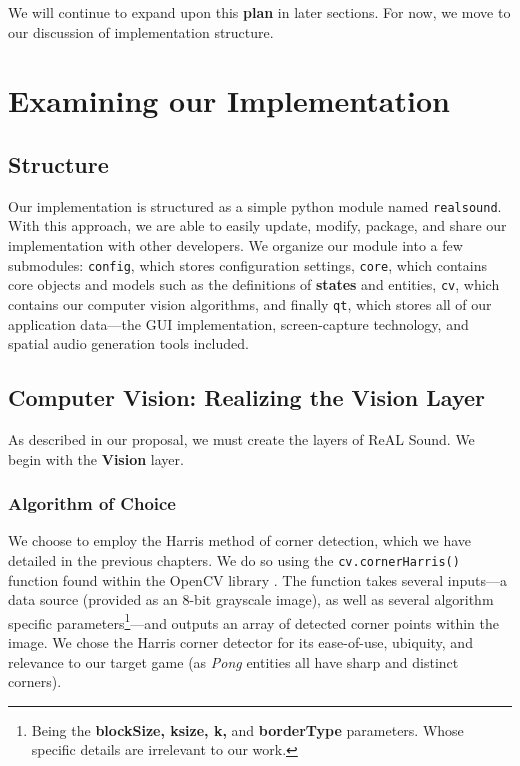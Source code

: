 \documentclass{report}
\newcommand{\rs}{ReAL Sound\xspace}
\newcommand{\state}[1]{\textbf{#1}}
\newcommand{\vision}{\textbf{Vision}\xspace}
\newcommand{\tech}[1]{\textbf{#1}}
\begin{document}
We will continue to expand upon this \state{plan} in later sections. For now, we move to our discussion of implementation structure.

\section{Examining our Implementation}

\subsection{Structure}

Our implementation is structured as a simple python module named \texttt{realsound}. With this approach, we are able to easily update, modify, package, and share our implementation with other developers. We organize our module into a few submodules: \texttt{config}, which stores configuration settings, \texttt{core}, which contains core objects and models such as the definitions of \state{states} and entities, \texttt{cv}, which contains our computer vision algorithms, and finally \texttt{qt}, which stores all of our application data---the GUI implementation, screen-capture technology, and spatial audio generation tools included. 

\subsection{Computer Vision: Realizing the Vision Layer}

As described in our proposal, we must create the layers of \rs. We begin with the \vision layer. 

\subsubsection{Algorithm of Choice}

We choose to employ the Harris method of corner detection, which we have detailed in the previous chapters. We do so using the \texttt{cv.cornerHarris()} function found within the OpenCV library \cite{OpenCV}. The function takes several inputs---a data source (provided as an 8-bit grayscale image), as well as several algorithm specific parameters\footnote{Being the \tech{blockSize, ksize, k, } and \tech{borderType} parameters. Whose specific details are irrelevant to our work.}---and outputs an array of detected corner points within the image. We chose the Harris corner detector for its ease-of-use, ubiquity, and relevance to our target game (as \emph{Pong} entities all have sharp and distinct corners).
\end{document}
